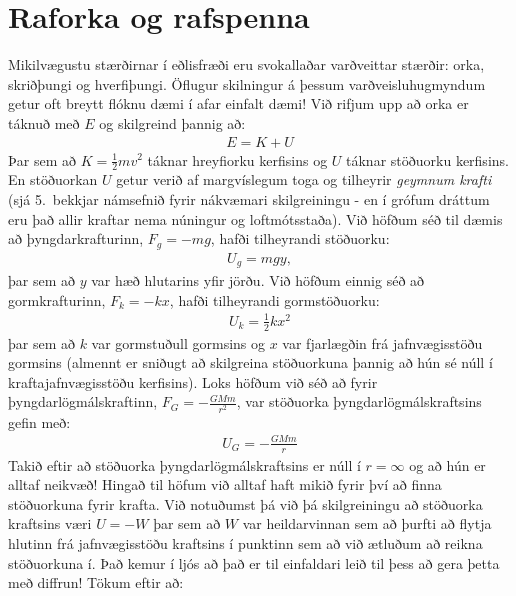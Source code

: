 \ifdefined \wholebook \else\documentclass[oneside]{book}\usepackage{EdlBook}\graphicspath{{figures/}}
\begin{document}
%
\setcounter{chapter}{15} %
%
\fi

\renewcommand{\thefigure}{\arabic{figure}}


\chapter{Raforka og rafspenna}

Mikilvægustu stærðirnar í eðlisfræði eru svokallaðar varðveittar stærðir: orka, skriðþungi og hverfiþungi. Öflugur skilningur á þessum varðveisluhugmyndum getur oft breytt flóknu dæmi í afar einfalt dæmi! Við rifjum upp að orka er táknuð með $E$ og skilgreind þannig að:
\begin{align*}
    E = K + U
\end{align*}
Þar sem að $K = \frac{1}{2}mv^2$ táknar hreyfiorku kerfisins og $U$ táknar stöðuorku kerfisins. En stöðuorkan $U$ getur verið af margvíslegum toga og tilheyrir \emph{geymnum krafti} (sjá 5.~bekkjar námsefnið
fyrir nákvæmari skilgreiningu - en í grófum dráttum eru það allir kraftar nema núningur og loftmótsstaða). Við höfðum séð til dæmis að þyngdarkrafturinn, $F_g = -mg$, hafði tilheyrandi stöðuorku:
\begin{align*}
    U_g = mgy,
\end{align*}
þar sem að $y$ var hæð hlutarins yfir jörðu. Við höfðum einnig séð að gormkrafturinn, $F_k = -kx$, hafði tilheyrandi gormstöðuorku:
\begin{align*}
    U_k = \frac{1}{2}kx^2
\end{align*}
þar sem að $k$ var gormstuðull gormsins og $x$ var fjarlægðin frá jafnvægisstöðu gormsins (almennt er sniðugt að skilgreina stöðuorkuna þannig að hún sé núll í kraftajafnvægisstöðu kerfisins). Loks höfðum við séð að fyrir þyngdarlögmálskraftinn, $F_G = -\frac{GMm}{r^2}$, var stöðuorka þyngdarlögmálskraftsins gefin með:
\begin{align*}
    U_G = -\frac{GMm}{r}
\end{align*}
Takið eftir að stöðuorka þyngdarlögmálskraftsins er núll í $r = \infty$ og að hún er alltaf neikvæð! Hingað til höfum við alltaf haft mikið fyrir því að finna stöðuorkuna fyrir krafta. Við notuðumst þá við þá skilgreiningu að stöðuorka kraftsins væri $U = -W$ þar sem að $W$ var heildarvinnan sem að þurfti að flytja hlutinn frá jafnvægisstöðu kraftsins í punktinn sem að við ætluðum að reikna stöðuorkuna í. Það kemur í ljós að það er til einfaldari leið til þess að gera þetta með diffrun! Tökum eftir að:
\end{document}

